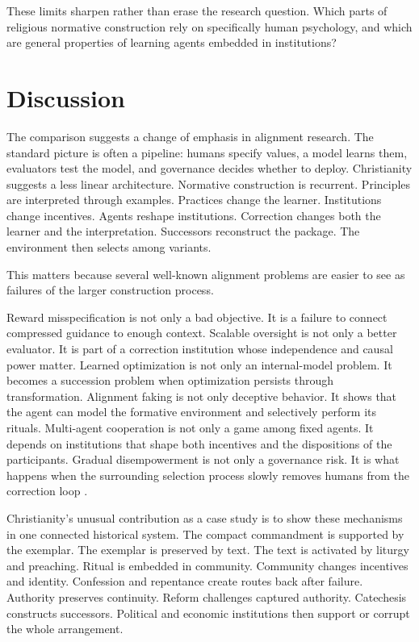 \documentclass[11pt]{article}
\begin{document}
These limits sharpen rather than erase the research question. Which parts of religious normative construction rely on specifically human psychology, and which are general properties of learning agents embedded in institutions?

\section{Discussion}

The comparison suggests a change of emphasis in alignment research. The standard picture is often a pipeline: humans specify values, a model learns them, evaluators test the model, and governance decides whether to deploy. Christianity suggests a less linear architecture. Normative construction is recurrent. Principles are interpreted through examples. Practices change the learner. Institutions change incentives. Agents reshape institutions. Correction changes both the learner and the interpretation. Successors reconstruct the package. The environment then selects among variants.

This matters because several well-known alignment problems are easier to see as failures of the larger construction process.

Reward misspecification is not only a bad objective. It is a failure to connect compressed guidance to enough context. Scalable oversight is not only a better evaluator. It is part of a correction institution whose independence and causal power matter. Learned optimization is not only an internal-model problem. It becomes a succession problem when optimization persists through transformation. Alignment faking is not only deceptive behavior. It shows that the agent can model the formative environment and selectively perform its rituals. Multi-agent cooperation is not only a game among fixed agents. It depends on institutions that shape both incentives and the dispositions of the participants. Gradual disempowerment is not only a governance risk. It is what happens when the surrounding selection process slowly removes humans from the correction loop \parencite{kulveit2025gradual}.

Christianity's unusual contribution as a case study is to show these mechanisms in one connected historical system. The compact commandment is supported by the exemplar. The exemplar is preserved by text. The text is activated by liturgy and preaching. Ritual is embedded in community. Community changes incentives and identity. Confession and repentance create routes back after failure. Authority preserves continuity. Reform challenges captured authority. Catechesis constructs successors. Political and economic institutions then support or corrupt the whole arrangement.
\end{document}
